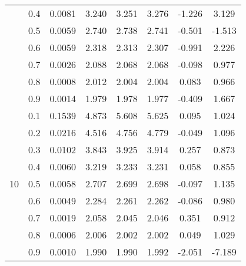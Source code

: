 \documentclass[11pt,a4paper]{report}
\begin{document}
\begin{longtable}{ | c | c || c | c | c | c | c | c | }
 & 0.4 & 0.0081 & 3.240 & 3.251 & 3.276 & -1.226 & 3.129 \\
 & 0.5 & 0.0059 & 2.740 & 2.738 & 2.741 & -0.501 & -1.513 \\
 & 0.6 & 0.0059 & 2.318 & 2.313 & 2.307 & -0.991 & 2.226 \\
 & 0.7 & 0.0026 & 2.088 & 2.068 & 2.068 & -0.098 & 0.977 \\
 & 0.8 & 0.0008 & 2.012 & 2.004 & 2.004 & 0.083 & 0.966 \\
 & 0.9 & 0.0014 & 1.979 & 1.978 & 1.977 & -0.409 & 1.667 \\
 \hline
\multirow{9}{*}{10} & 0.1 & 0.1539 & 4.873 & 5.608 & 5.625 & 0.095 & 1.024 \\
 & 0.2 & 0.0216 & 4.516 & 4.756 & 4.779 & -0.049 & 1.096 \\
 & 0.3 & 0.0102 & 3.843 & 3.925 & 3.914 & 0.257 & 0.873 \\
 & 0.4 & 0.0060 & 3.219 & 3.233 & 3.231 & 0.058 & 0.855 \\
 & 0.5 & 0.0058 & 2.707 & 2.699 & 2.698 & -0.097 & 1.135 \\
 & 0.6 & 0.0049 & 2.284 & 2.261 & 2.262 & -0.086 & 0.980 \\
 & 0.7 & 0.0019 & 2.058 & 2.045 & 2.046 & 0.351 & 0.912 \\
 & 0.8 & 0.0006 & 2.006 & 2.002 & 2.002 & 0.049 & 1.029 \\
 & 0.9 & 0.0010 & 1.990 & 1.990 & 1.992 & -2.051 & -7.189 \\
 \hline
\hline
\end{longtable}
\end{document}
